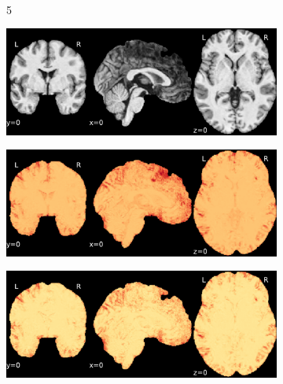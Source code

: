 \documentclass{article}
\begin{document}
\begin{appendices}
\begin{landscape}
\begin{figure}
\begin{subfigure}[t]{0.2\paperheight}
            \end{subfigure} \\
            \begin{subfigure}[b][][c]{0.01\paperwidth} 5 \vspace*{15pt} \end{subfigure}
            \begin{subfigure}[t]{0.2\paperheight}
                \centering
                \includegraphics[width=\textwidth]{figures/sig/0mm/ieee_ds001748_sub-adult15.pdf}
            \end{subfigure}
            \begin{subfigure}[t]{0.2\paperheight}
                \centering
                \includegraphics[width=\textwidth]{figures/sig/0mm/rr_ds001748_sub-adult15_sig.pdf}
            \end{subfigure}
            \begin{subfigure}[t]{0.2\paperheight}
                \centering
                \includegraphics[width=\textwidth]{figures/sig/0mm/rs_ds001748_sub-adult15_sig.pdf}

\end{subfigure}
\end{figure}
\end{landscape}
\end{appendices}
\end{document}

